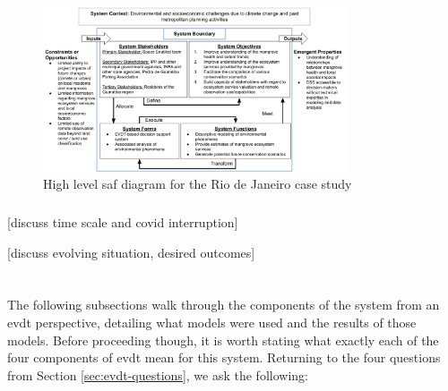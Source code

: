 \begin{figure}[H] 
\centering
\includegraphics[width=0.8\textwidth]{Figures/chap4/system-diagram-rio.png}
\caption[High level Systems Architecture Framework diagram for the Rio de Janeiro case study]{High level \ac{saf} diagram for the Rio de Janeiro case study}
\label{fig:system-diagram-rio}
\end{figure}

\subsubsection{}

[discuss time scale and covid interruption]

[discuss evolving situation, desired outcomes]

\section{} \label{sec:rio-evdt}

The following subsections walk through the components of the system from an \acf{evdt} perspective, detailing what models were used and the results of those models. Before proceeding though, it is worth stating what exactly each of the four components of \ac{evdt} mean for this system. Returning to the four questions from Section \ref{sec:evdt-questions}, we ask the following:

